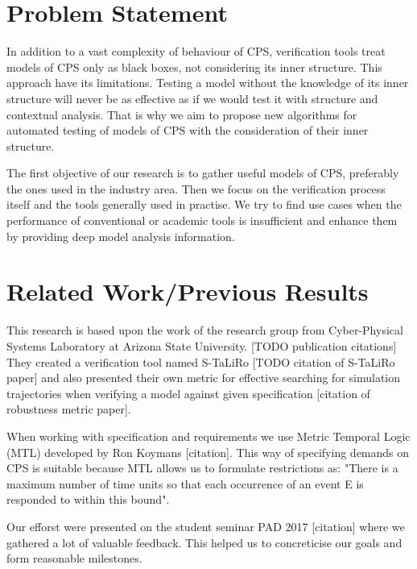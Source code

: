 \section{Problem Statement}
In addition to a vast complexity of behaviour of CPS, verification tools treat models of CPS only as black boxes, not considering its inner structure. This approach have its limitations. Testing a model without the knowledge of its inner structure will never be as effective as if we would test it with structure and contextual analysis. That is why we aim to propose new algorithms for automated testing of models of CPS with the consideration of their inner structure.

The first objective of our research is to gather useful models of CPS, preferably the ones used in the industry area. Then we focus on the verification process itself and the tools generally used in practise. We try to find use cases when the performance of conventional or academic tools is insufficient and enhance them by providing deep model analysis information.

\section{Related Work/Previous Results}
This research is based upon the work of the research group from Cyber-Physical Systems Laboratory at Arizona State University. [TODO publication citations] They created a verification tool named S-TaLiRo [TODO citation of S-TaLiRo paper] and also presented their own metric for effective searching for simulation trajectories when verifying a model against given specification [citation of robustness metric paper].

When working with specification and requirements we use Metric Temporal Logic (MTL) developed by Ron Koymans [citation]. This way of specifying demands on CPS is suitable because MTL allows us to formulate restrictions as: "There is a maximum number of time units so that each occurrence of an event E is responded to within this bound".

Our efforst were presented on the student seminar PAD 2017 [citation] where we gathered a lot of valuable feedback. This helped us to concreticise our goals and form reasonable milestones.

